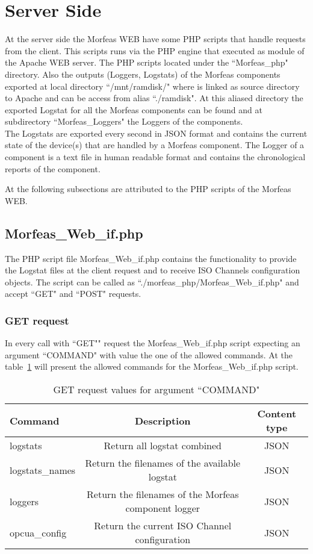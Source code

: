 \section{Server Side}
At the server side the Morfeas WEB have some PHP scripts that handle requests from the client. This scripts runs via the PHP engine that executed as module of the Apache WEB server.
The PHP scripts located under the ``Morfeas\_php" directory. Also the outputs (Loggers, Logstats) of the Morfeas components exported at local directory ``/mnt/ramdisk/" where is
linked as source directory to Apache and can be access from alias ``./ramdisk". At this aliased directory the exported Logstat for all the Morfeas components can be found and at
subdirectory ``Morfeas\_Loggers" the Loggers of the components.\\
The Logstats are exported every second in JSON format and contains the current state of the device(s) that are handled by a Morfeas component. The Logger of a component is
a text file in human readable format and contains the chronological reports of the component.

At the following subsections are attributed to the PHP scripts of the Morfeas WEB.

\subsection{Morfeas\_Web\_if.php}
The PHP script file Morfeas\_Web\_if.php contains the functionality to provide the Logstat files at the client request and to receive ISO Channels configuration objects.
The script can be called as ``./morfeas\_php/Morfeas\_Web\_if.php" and accept ``GET" and ``POST" requests.
\subsubsection{GET request}
In every call with ``GET"" request the Morfeas\_Web\_if.php script expecting an argument ``COMMAND" with value the one of the allowed commands.
At the table~\ref{table:Morfeas_Web_if} will present the allowed commands for the Morfeas\_Web\_if.php script.

\begin{table}[h]
\centering
\begin{tabular}{|l|c|c|}
 \hline
 \textbf{Command} & \textbf{Description} & \textbf{Content type}\\
 \hline
 logstats & Return all logstat combined & JSON \\
 logstats\_names & Return the filenames of the available logstat & JSON \\
 loggers & Return the filenames of the Morfeas component logger & JSON \\
 opcua\_config & Return the current ISO Channel configuration & JSON\\
 \hline
\end{tabular}
\caption{GET request values for argument ``COMMAND"}
\label{table:Morfeas_Web_if}
\end{table}

